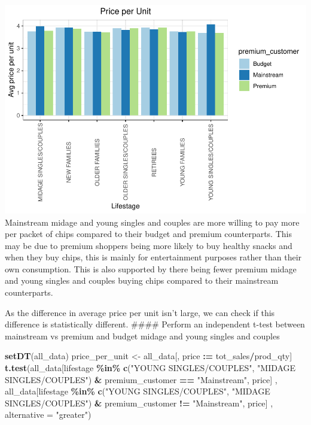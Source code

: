 \documentclass[
]{article}
\newenvironment{Shaded}{\begin{snugshade}}{\end{snugshade}}
\newcommand{\AttributeTok}[1]{\textcolor[rgb]{0.13,0.29,0.53}{#1}}
\newcommand{\FunctionTok}[1]{\textcolor[rgb]{0.13,0.29,0.53}{\textbf{#1}}}
\newcommand{\NormalTok}[1]{#1}
\newcommand{\OtherTok}[1]{\textcolor[rgb]{0.56,0.35,0.01}{#1}}
\newcommand{\SpecialCharTok}[1]{\textcolor[rgb]{0.81,0.36,0.00}{\textbf{#1}}}
\newcommand{\StringTok}[1]{\textcolor[rgb]{0.31,0.60,0.02}{#1}}
\begin{document}
\includegraphics{quantium_analysis_files/figure-latex/unnamed-chunk-35-1.pdf}
Mainstream midage and young singles and couples are more willing to pay
more per packet of chips compared to their budget and premium
counterparts. This may be due to premium shoppers being more likely to
buy healthy snacks and when they buy chips, this is mainly for
entertainment purposes rather than their own consumption. This is also
supported by there being fewer premium midage and young singles and
couples buying chips compared to their mainstream counterparts.

As the difference in average price per unit isn't large, we can check if
this difference is statistically different. \#\#\#\# Perform an
independent t-test between mainstream vs premium and budget midage and
young singles and couples

\begin{Shaded}
\begin{Highlighting}[]
\FunctionTok{setDT}\NormalTok{(all\_data)}
\NormalTok{price\_per\_unit }\OtherTok{\textless{}{-}}\NormalTok{ all\_data[, price }\SpecialCharTok{:=}\NormalTok{ tot\_sales}\SpecialCharTok{/}\NormalTok{prod\_qty]}
\FunctionTok{t.test}\NormalTok{(all\_data[lifestage }\SpecialCharTok{\%in\%} \FunctionTok{c}\NormalTok{(}\StringTok{"YOUNG SINGLES/COUPLES"}\NormalTok{, }\StringTok{"MIDAGE SINGLES/COUPLES"}\NormalTok{) }\SpecialCharTok{\&}\NormalTok{ premium\_customer }\SpecialCharTok{==} \StringTok{"Mainstream"}\NormalTok{, price]}
\NormalTok{, all\_data[lifestage }\SpecialCharTok{\%in\%} \FunctionTok{c}\NormalTok{(}\StringTok{"YOUNG SINGLES/COUPLES"}\NormalTok{, }\StringTok{"MIDAGE SINGLES/COUPLES"}\NormalTok{) }\SpecialCharTok{\&}\NormalTok{ premium\_customer }\SpecialCharTok{!=} \StringTok{"Mainstream"}\NormalTok{, price]}
\NormalTok{, }\AttributeTok{alternative =} \StringTok{"greater"}\NormalTok{)}
\end{Highlighting}
\end{Shaded}
\end{document}
